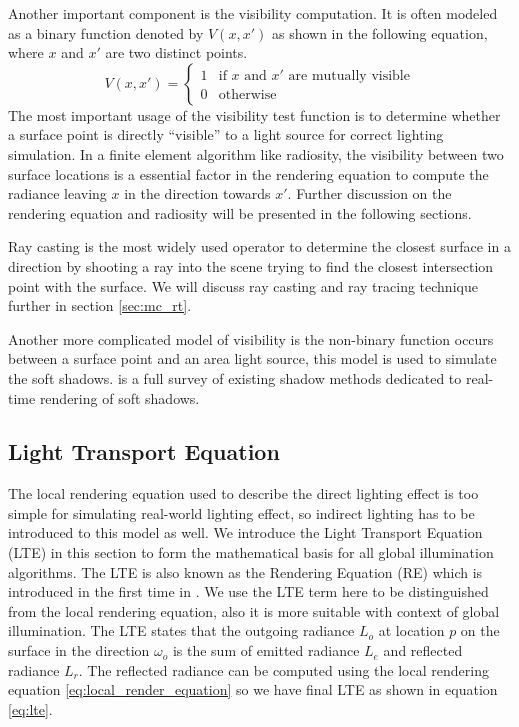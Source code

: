 Another important component is the visibility computation. It is often modeled as a binary function denoted by \(V(x, x')\) as shown in the following equation, where \(x\) and \(x'\) are two distinct points.
  \begin{equation}
    V(x, x')=\left\{
    \begin{array}{ll}
      1  & \text{if $x$ and $x'$ are mutually visible} \\
      0  & \text{otherwise}
    \end{array}
    \right.
    \label{eq:visibility_test}
  \end{equation}
The most important usage of the visibility test function is to determine whether a surface point is directly ``visible'' to a light source for correct lighting simulation. In a finite element algorithm like radiosity, the visibility between two surface locations is a essential factor in the rendering equation to compute the radiance leaving \(x\) in the direction towards \(x'\). Further discussion on the rendering equation and radiosity will be presented in the following sections.

Ray casting is the most widely used operator to determine the closest surface in a direction by shooting a ray into the scene trying to find the closest intersection point with the surface. We will discuss ray casting and ray tracing technique further in section \ref{sec:mc_rt}.

Another more complicated model of visibility is the non-binary function occurs between a surface point and an area light source, this model is used to simulate the soft shadows.  \cite{Hasenfratz2003} is a full survey of existing shadow methods dedicated to real-time rendering of soft shadows.

\subsection{Light Transport Equation}

The local rendering equation used to describe the direct lighting effect is too simple for simulating real-world lighting effect, so indirect lighting has to be introduced to this model as well. We introduce the Light Transport Equation (LTE) in this section to form the mathematical basis for all global illumination algorithms. The LTE is also known as the Rendering Equation (RE) which is introduced in the first time in \cite{Kajiya:1986:RE:15922.15902}. We use the LTE term here to be distinguished from the local rendering equation, also it is more suitable with context of global illumination. The LTE states that the outgoing radiance \(L_{o}\) at location \(p\) on the surface in the direction \(\omega_{o}\) is the sum of emitted radiance \(L_{e}\) and reflected radiance \(L_{r}\). The reflected radiance can be computed using the local rendering equation \ref{eq:local_render_equation} so we have final LTE as shown in equation \ref{eq:lte}.

